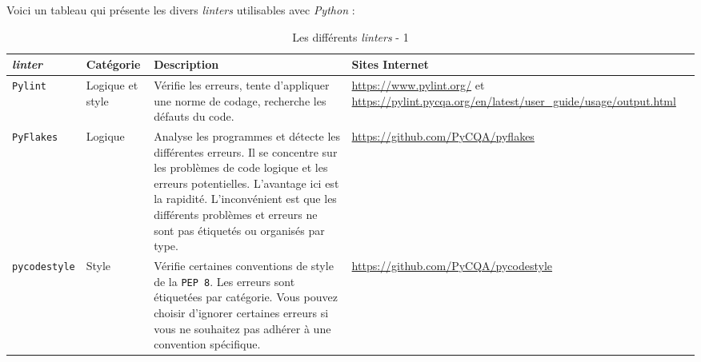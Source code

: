 \documentclass[a4paper,12pt]{book}
\begin{document}
Voici un tableau qui présente les divers \textit{linters} utilisables avec \textit{Python} :
\begin{table}[h]
\begin{center}
\begin{tabular}{|p{2.2cm}|p{1.8cm}|p{4.2cm}|p{5cm}|}
\hline
\textbf{\textit{linter}} & \textbf{Catégorie} & \textbf{Description} & \textbf{Sites Internet} \\
\hline 
\texttt{Pylint} & Logique et style & Vérifie les erreurs, tente d'appliquer une norme de codage, recherche les défauts du code. & \url{https://www.pylint.org/} et \url{https://pylint.pycqa.org/en/latest/user_guide/usage/output.html} \\
\hline
\texttt{PyFlakes} & Logique & Analyse les programmes et détecte les différentes erreurs. Il se concentre sur les problèmes de code logique et les erreurs potentielles. L'avantage ici est la rapidité. L'inconvénient est que les différents problèmes et erreurs ne sont pas étiquetés ou organisés par type. & \url{https://github.com/PyCQA/pyflakes} \\
\hline
\texttt{pycodestyle} & Style & Vérifie certaines conventions de style de la \texttt{PEP 8}. Les erreurs sont étiquetées par catégorie. Vous pouvez choisir d'ignorer certaines erreurs si vous ne souhaitez pas adhérer à une convention spécifique. & \url{https://github.com/PyCQA/pycodestyle} \\
\hline
\end{tabular}
\caption{Les différents \textit{linters} - 1} 
\end{center}
\end{table}
\newpage
\end{document}
